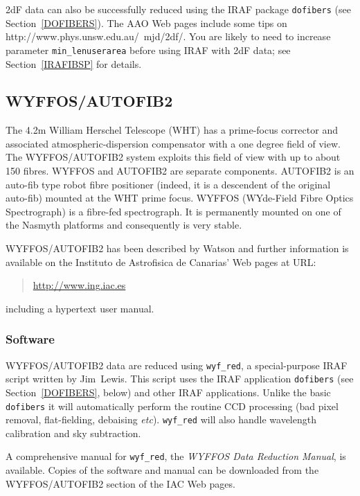 \documentclass[chapters,twoside,11pt]{starlink}
\begin{document}
2dF data can also be successfully reduced using the IRAF package \texttt{dofibers} (see Section~\ref{DOFIBERS}).  The AAO Web pages include
some tips on 
{http://www.phys.unsw.edu.au/~mjd/2df/}.  You are likely to need to
increase parameter \texttt{min\_lenuserarea} before using IRAF with 2dF
data; see Section~\ref{IRAFIBSP} for details.

\subsection{\label{WYFFOS_I}WYFFOS/AUTOFIB2}

The 4.2m William Herschel Telescope (WHT) has a prime-focus corrector
and associated
\newline atmospheric-dispersion compensator with a one degree
field of view.  The WYFFOS/AUTOFIB2 system exploits this field of
view with up to about 150 fibres.  WYFFOS and AUTOFIB2 are separate
components.  AUTOFIB2 is an auto-fib type robot fibre positioner
(indeed, it is a descendent of the original auto-fib) mounted at the
WHT prime focus.  WYFFOS (WYde-Field Fibre Optics Spectrograph) is a
fibre-fed spectrograph.  It is permanently mounted on one of the Nasmyth
platforms and consequently is very stable.

WYFFOS/AUTOFIB2 has been described by Watson\cite{WATSON95} and
further information is available on the Instituto de Astrofisica de
Canarias' Web pages at URL:

\begin{quote}
\url{http://www.ing.iac.es}
\end{quote}

including a hypertext user manual.

\subsubsection{\label{WYFFOS_S}Software}

WYFFOS/AUTOFIB2 data are reduced using \texttt{wyf\_red}, a special-purpose
IRAF script written by Jim~Lewis.  This script uses the IRAF application
\texttt{dofibers} (see Section~\ref{DOFIBERS}, below) and other IRAF
applications.  Unlike the basic \texttt{dofibers} it will automatically
perform the routine CCD processing (bad pixel removal, flat-fielding,
debaising \emph{etc}).  \texttt{wyf\_red} will also handle wavelength calibration
and sky subtraction.

A comprehensive manual for \texttt{wyf\_red}, the \textit{WYFFOS Data
Reduction Manual}\/\cite{LEWIS96}, is available.  Copies of the software
and manual can be downloaded from the WYFFOS/AUTOFIB2 section of the
IAC Web pages.
\end{document}
